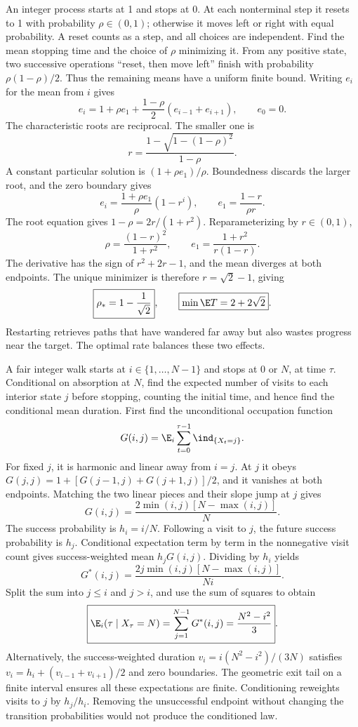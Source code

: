 An integer process starts at 1 and stops at 0. At each nonterminal step it resets to 1 with probability $\rho\in(0,1)$; otherwise it moves left or right with equal probability. A reset counts as a step, and all choices are independent. Find the mean stopping time and the choice of $\rho$ minimizing it.
\solution From any positive state, two successive operations ``reset, then move left'' finish with probability $\rho(1-\rho)/2$. Thus the remaining means have a uniform finite bound. Writing $e_i$ for the mean from $i$ gives
\[
 e_i=1+\rho e_1+\frac{1-\rho}{2}(e_{i-1}+e_{i+1}),
 \qquad e_0=0.
\]
The characteristic roots are reciprocal. The smaller one is
\[
 r=\frac{1-\sqrt{1-(1-\rho)^2}}{1-\rho}.
\]
A constant particular solution is $(1+\rho e_1)/\rho$. Boundedness discards the larger root, and the zero boundary gives
\[
 e_i=\frac{1+\rho e_1}{\rho}(1-r^i),\qquad
 \boxed{e_1=\frac{1-r}{\rho r}}.
\]
The root equation gives $1-\rho=2r/(1+r^2)$. Reparameterizing by $r\in(0,1)$,
\[
 \rho=\frac{(1-r)^2}{1+r^2},\qquad
 e_1=\frac{1+r^2}{r(1-r)}.
\]
The derivative has the sign of $r^2+2r-1$, and the mean diverges at both endpoints. The unique minimizer is therefore $r=\sqrt2-1$, giving
\[
 \boxed{\rho_*=1-\frac1{\sqrt2}},\qquad
 \boxed{\min\E T=2+2\sqrt2}.
\]
\insight Restarting retrieves paths that have wandered far away but also wastes progress near the target. The optimal rate balances these two effects.

A fair integer walk starts at $i\in\{1,\ldots,N-1\}$ and stops at 0 or $N$, at time $\tau$. Conditional on absorption at $N$, find the expected number of visits to each interior state $j$ before stopping, counting the initial time, and hence find the conditional mean duration.
\solution First find the unconditional occupation function
\[
 G(i,j)=\E_i\sum_{t=0}^{\tau-1}\ind_{\{X_t=j\}}.
\]
For fixed $j$, it is harmonic and linear away from $i=j$. At $j$ it obeys $G(j,j)=1+[G(j-1,j)+G(j+1,j)]/2$, and it vanishes at both endpoints. Matching the two linear pieces and their slope jump at $j$ gives
\[
 G(i,j)=\frac{2\min(i,j)[N-\max(i,j)]}{N}.
\]
The success probability is $h_i=i/N$. Following a visit to $j$, the future success probability is $h_j$. Conditional expectation term by term in the nonnegative visit count gives success-weighted mean $h_jG(i,j)$. Dividing by $h_i$ yields
\[
 \boxed{G^*(i,j)=\frac{2j\min(i,j)[N-\max(i,j)]}{Ni}}.
\]
Split the sum into $j\le i$ and $j>i$, and use the sum of squares to obtain
\[
 \boxed{\E_i(\tau\mid X_\tau=N)=\sum_{j=1}^{N-1}G^*(i,j)
 =\frac{N^2-i^2}{3}}.
\]
Alternatively, the success-weighted duration $v_i=i(N^2-i^2)/(3N)$ satisfies $v_i=h_i+(v_{i-1}+v_{i+1})/2$ and zero boundaries. The geometric exit tail on a finite interval ensures all these expectations are finite.
\insight Conditioning reweights visits to $j$ by $h_j/h_i$. Removing the unsuccessful endpoint without changing the transition probabilities would not produce the conditioned law.

